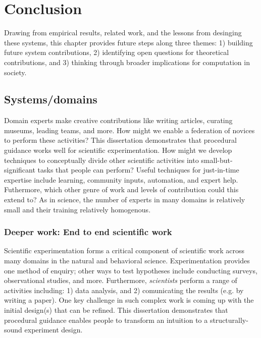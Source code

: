 
\chapter{Conclusion}
Drawing from empirical results, related work, and the lessons from desinging these systems, this chapter provides future steps along three themes: 1) building future system contributions, 2) identifying open questions for theoretical contributions, and 3) thinking through broader implications for computation in society.

\section{Systems/domains} 

Domain experts make creative contributions like writing articles, curating museums, leading teams, and more. How might we enable a federation of novices to perform these activities? This dissertation demonstrates that procedural guidance works well for scientific experimentation. How might we develop techniques to conceptually divide other scientific activities into small-but-significant tasks that people can perform? Useful techniques for just-in-time expertise include learning, community inputs, automation, and expert help. Futhermore, which other genre of work and levels of contribution could this extend to? As in science, the number of experts in many domains is relatively small and their training relatively homogenous. 

\subsection{Deeper work: End to end scientific work}
Scientific experimentation forms a critical component of scientific work across many domains in the natural and behavioral science. Experimentation provides one method of enquiry; other ways to test hypotheses include conducting surveys, observational studies, and more. Furthermore, \textit{scientists} perform a range of activities including: 1) data analysis, and 2) comunicating the results (e.g. by writing a paper). One key challenge in such complex work is coming up with the initial design(s) that can be refined. This dissertation demonstrates that procedural guidance enables people to transform an intuition to a structurally-sound experiment design.

